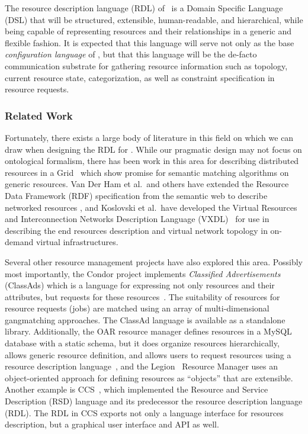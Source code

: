 The resource description language (RDL) of \ngrm\ is a Domain
Specific Language (DSL) that will be structured, extensible,
human-readable, and hierarchical, while being capable of
representing resources and their relationships in a generic and
flexible fashion. It is expected that this language will serve not
only as the base \emph{configuration language} of \ngrm, but that
this language will be the de-facto communication substrate for
gathering resource information such as topology, current resource
state, categorization, as well as constraint specification in
resource requests.

\subsubsection{Related Work}

Fortunately, there exists a large body of literature in this
field on which we can draw when designing the RDL for \ngrm.
While our pragmatic design may not focus on ontological formalism,
there has been work in this area for describing distributed resources
in a Grid~\cite{Castano:2004, Pernas:2005, Koning:2011:UOR:1998662.1998819}
which show promise for semantic matching algorithms on generic resources.
Van Der Ham et al.\ and others have extended the Resource Data Framework (RDF)
specification from the semantic web to describe networked resources
\cite{vanderHam:2006:URD:1160256.1160260, VanDerHam:2008:DTI:2285568.2285672, vanderHam:2006:SHN:1188455.1188643},
and Koslovski et al.\ have developed the Virtual Resources and
Interconnection Networks Description Language (VXDL)~\cite{Koslovski_Primet_2009} for use in
describing the end resources description and virtual network
topology in on-demand virtual infrastructures.

Several other resource management projects have also explored this
area. Possibly most importantly, the Condor project implements
\emph{Classified Advertisements} (ClassAds) which is a language
for expressing not only resources and their attributes, but
requests for these resources~\cite{ClassAd}. The suitability
of resources for resource requests (jobs) are matched using an
array of multi-dimensional gangmatching approaches. The ClassAd
language is available as a standalone library. Additionally, the
OAR resource manager defines resources in a MySQL database with
a static schema, but it does organize resources hierarchically,
allows generic resource definition, and allows users to request
resources using a resource description language~\cite{Oar}, and
the Legion~\cite{LegionGrid,LegionRM} Resource Manager uses an
object-oriented approach for defining resources as ``objects''
that are extensible. Another example is CCS~\cite{Keller98ccsresource},
which implemented the Resource and Service Description (RSD)
language and its predecessor the resource description language (RDL).
The RDL in CCS exports not only a language interface for resources
description, but a graphical user interface and API as well.

